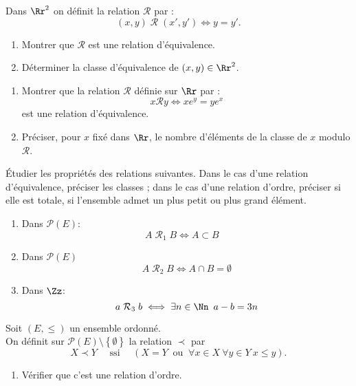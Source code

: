 \documentclass[10pt, a4paper, twocolumn]{homework}
\begin{document}
Dans $\Rr^2$ on d\'efinit la relation $\mathcal{R}$ par :
$$(x,y)\;\mathcal{R}\;(x',y')\iff y=y'.$$
\begin{enumerate}
    \item Montrer que $\mathcal{R}$ est une relation d'\'equivalence.
    \item D\'eterminer la classe d'\'equivalence de $(x,y)\in \Rr^2$.
\end{enumerate}

\begin{enumerate}
  \item
Montrer que la relation $\mathcal{R}$ d\'{e}finie sur $\Rr$ par :
$$x\mathcal{R} y\Longleftrightarrow xe^{y}=ye^{x}$$
est une relation d'\'{e}quivalence.
\item
Pr\'{e}ciser, pour $x$ fix\'{e} dans $\Rr$, le nombre d'\'{e}l\'{e}ments de
la classe de $x$ modulo $\mathcal{R}$.
\end{enumerate}
\'Etudier les propri\'et\'es des relations suivantes. Dans le cas
d'une relation d'\'equivalence, pr\'eciser les classes ; dans le cas
d'une relation d'ordre, pr\'eciser si elle est totale, si l'ensemble admet
un plus petit ou plus grand \'el\'ement.
\begin{enumerate}
    \item Dans $\mathcal{P}(E)$:
      $$A\;\mathcal{R}_1\; B \iff A\subset B\quad$$

    \item Dans $\mathcal{P}(E)$ $$A\;\mathcal{R}_2\; B \iff A\cap
      B=\emptyset$$
    \item Dans $\Zz$:
$$ a\;\mathcal{R}_3\; b \iff \exists n\in \Nn \ \,a-b=3n$$
\end{enumerate}
Soit $ (E, \leq)$ un ensemble ordonn\'e.\\
On d\'efinit sur $\mathcal{P} (E)\setminus\left\{ \emptyset \right\}$ la relation
$\prec$ par 
$$X \prec Y \quad \text{ ssi } \quad (X = Y \ \text{ ou } \ 
\forall x \in X \  \forall y \in Y \  x \leq y).$$ 
\begin{enumerate}
  \item  V\'erifier que c'est une relation d'ordre.
\end{enumerate}

\end{document}
